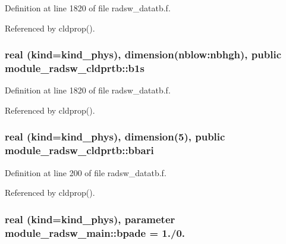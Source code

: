 Definition at line 1820 of file radsw\+\_\+datatb.\+f.



Referenced by cldprop().

\subsubsection[{\texorpdfstring{b1s}{b1s}}]{\setlength{\rightskip}{0pt plus 5cm}real (kind=kind\+\_\+phys), dimension(nblow\+:nbhgh), public module\+\_\+radsw\+\_\+cldprtb\+::b1s}\hypertarget{group__module__radsw__main_ga2d2296e76fb85b66bd4583bcb9fa271b}{}\label{group__module__radsw__main_ga2d2296e76fb85b66bd4583bcb9fa271b}


Definition at line 1820 of file radsw\+\_\+datatb.\+f.



Referenced by cldprop().

\subsubsection[{\texorpdfstring{bbari}{bbari}}]{\setlength{\rightskip}{0pt plus 5cm}real (kind=kind\+\_\+phys), dimension(5), public module\+\_\+radsw\+\_\+cldprtb\+::bbari}\hypertarget{group__module__radsw__main_gad5342321ccd4759cb70f7a673620ee19}{}\label{group__module__radsw__main_gad5342321ccd4759cb70f7a673620ee19}


Definition at line 200 of file radsw\+\_\+datatb.\+f.



Referenced by cldprop().

\subsubsection[{\texorpdfstring{bpade}{bpade}}]{\setlength{\rightskip}{0pt plus 5cm}real (kind=kind\+\_\+phys), parameter module\+\_\+radsw\+\_\+main\+::bpade = 1./0.\hspace{0.3cm}{\ttfamily [private]}}\hypertarget{group__module__radsw__main_gacd9ae7c14cbfdc55f1f0fff637ca0331}{}\label{group__module__radsw__main_gacd9ae7c14cbfdc55f1f0fff637ca0331}


